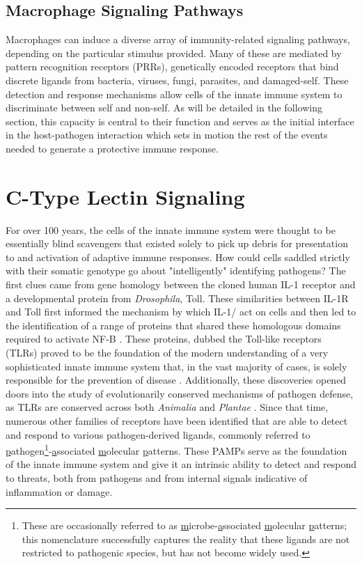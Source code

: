 \subsection{Macrophage Signaling Pathways}\label{macsig}

Macrophages can induce a diverse array of immunity-related signaling pathways, depending on the particular stimulus provided. Many of these are mediated by pattern recognition receptors (PRRs), genetically encoded receptors that bind discrete ligands from bacteria, viruses, fungi, parasites, and damaged-self. These detection and response mechanisms allow cells of the innate immune system to discriminate between self and non-self. As will be detailed in the following section, this capacity is central to their function and serves as the initial interface in the host-pathogen interaction which sets in motion the rest of the events needed to generate a protective immune response.

\section{C-Type Lectin Signaling}\label{clrs}

For over 100 years, the cells of the innate immune system were thought to be essentially blind scavengers that existed solely to pick up debris for presentation to and activation of adaptive immune responses. How could cells saddled strictly with their somatic genotype go about "intelligently" identifying pathogens? The first clues came from gene homology between the cloned human IL-1 receptor and a developmental protein from \textit{Drosophila}, Toll. These similarities between IL-1R and Toll first informed the mechanism by which IL-1\textalpha/\textbeta{} act on cells and then led to the identification of a range of proteins that shared these homologous domains required to activate NF-\textkappa B \citep{ONeill2013, Rock1998}. These proteins, dubbed the Toll-like receptors (TLRs) proved to be the foundation of the modern understanding of a very sophisticated innate immune system that, in the vast majority of cases, is solely responsible for the prevention of disease \citep{Janeway2005}. Additionally, these discoveries opened doors into the study of evolutionarily conserved mechanisms of pathogen defense, as TLRs are conserved across both \textit{Animalia} and \textit{Plantae} \citep{Armant2002, Ausubel2005}. Since that time, numerous other families of receptors have been identified that are able to detect and respond to various pathogen-derived ligands, commonly referred to \underline{p}athogen\footnote{These are occasionally referred to as \underline{m}icrobe-\underline{a}ssociated \underline{m}olecular \underline{p}atterns; this nomenclature successfully captures the reality that these ligands are not restricted to pathogenic species, but has not become widely used.}-\underline{a}ssociated \underline{m}olecular \underline{p}atterns. These PAMPs serve as the foundation of the innate immune system and give it an intrinsic ability to detect and respond to threats, both from pathogens and from internal signals indicative of inflammation or damage.


